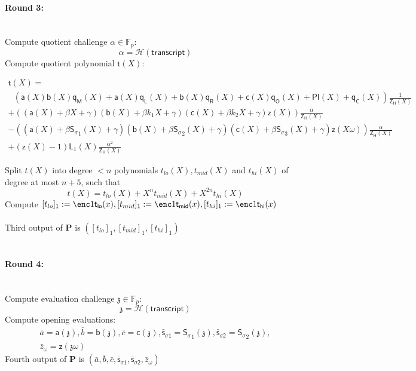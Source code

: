 \documentclass[11pt]{article} %
\newcommand{\F}{\ensuremath{\mathbb F}\xspace}
\newcommand{\chalpoint}{\ensuremath{\mathfrak{z}}\xspace}
\newcommand{\hash}{\ensuremath{\mathcal{H}}\xspace}
\newcommand{\prv}{\ensuremath{\mathsf{\mathbf{P}}}\xspace}
\newcommand{\sigpoly}{\ensuremath{\mathsf{S_{\sigma}}}\xspace}
\newcommand{\sigpolyevala}{\ensuremath{\mathsf{\bar{s}_{\sigma1}}}\xspace}
\newcommand{\sigpolyevalb}{\ensuremath{\mathsf{\bar{s}_{\sigma2}}}\xspace}
\newcommand{\pubinppoly}{\ensuremath{\mathsf{PI}}\xspace}
\newcommand{\ZeroH}{\ensuremath{Z_{H}} \xspace}
\newcommand{\lpoly}{\ensuremath{\mathsf{a}}\xspace}
\newcommand{\rpoly}{\ensuremath{\mathsf{b}}\xspace}
\newcommand{\opoly}{\ensuremath{\mathsf{c}}\xspace}
\newcommand{\idpermpoly}{\ensuremath{\mathsf{z}}\xspace}
\newcommand{\lagrangepoly}{\ensuremath{\mathsf{L}}\xspace}
\newcommand{\zeropoly}{\ensuremath{\mathsf{\ZeroH}}\xspace}
\newcommand{\snark}{\ensuremath{\mathsf{snark}}\xspace}
\newcommand{\Prove}{\mathcal{P}}
\newcommand{\Psnark}{\prv}%
\newcommand{\transcript}{\ensuremath{\mathsf{transcript}}\xspace}
\begin{document}
	\paragraph{\textbf{Round 3:}} \ \\
	Compute quotient challenge $\alpha \in \F_p:$ \[ \alpha = \hash(\transcript) \]
	Compute quotient polynomial $\mathsf{t}(X):$
	\begin{adjustwidth*}{-22mm}{-22mm}
	$$
	\begin{array}{l}
	\mathsf{t}(X) = \\
	\ \ \ \left( \lpoly(X)\rpoly(X)\mathsf{q_M}(X) + \lpoly(X)\mathsf{q_L}(X) + \rpoly(X)\mathsf{q_R}(X) + \opoly(X)\mathsf{q_O}(X) + \pubinppoly(X) + \mathsf{q_C}(X) \right) \frac{1}{\zeropoly(X)} \\
	+ \left((\lpoly(X) + \beta X + \gamma)(\rpoly(X) + \beta k_1 X + \gamma)(\opoly(X) + \beta k_2 X + \gamma )\idpermpoly(X) \right) \frac{\alpha}{\zeropoly(X)} \\
	- \left((\lpoly(X) + \beta \sigpoly_1(X) + \gamma)(\rpoly(X) + \beta \sigpoly_2(X) + \gamma)(\opoly(X) + \beta \sigpoly_3(X) + \gamma) \idpermpoly(X\omega) \right)\frac{\alpha}{\zeropoly(X)} \\
	+ \left(\idpermpoly(X) - 1 \right) \lagrangepoly_1(X) \frac{\alpha^2}{\zeropoly(X)}
	\end{array}
	$$
	\end{adjustwidth*}
	Split $t(X)$ into degree $<n$ polynomials $t_{lo}(X), t_{mid}(X)$ and $t_{hi}(X)$ of degree at most $n+5$, such that
	$$
	t(X) = t_{lo}(X) + X^nt_{mid}(X) + X^{2n}t_{hi}(X)
	$$
	Compute $[t_{lo}]_{1} := \enc1{\mathsf{t_{lo}}(x)}, [t_{mid}]_1 := \enc1{\mathsf{t_{mid}}(x)}, [t_{hi}]_1 := \enc1{\mathsf{t_{hi}}(x)}$ \\ \\
	Third output of $\Psnark$ is $([t_{lo}]_1, [t_{mid}]_1, [t_{hi}]_1)$
	\\ \\
	\noindent
	\paragraph{\textbf{Round 4:}} \ \\Compute evaluation challenge $\chalpoint \in \F_p:$ \[ \chalpoint = \hash(\transcript)\]
	Compute opening evaluations:
	$$
	\begin{array}{c}
	\bar{a} = \lpoly(\chalpoint), \bar{b} = \rpoly(\chalpoint), \bar{c} = \opoly(\chalpoint), \sigpolyevala = \sigpoly_1(\chalpoint), \sigpolyevalb = \sigpoly_2(\chalpoint), \\
	 \bar{z}_\omega = \idpermpoly(\chalpoint \omega)
	\end{array}
	$$
	Fourth output of $\Psnark$ is $(\bar{a}, \bar{b}, \bar{c}, \sigpolyevala, \sigpolyevalb, \bar{z}_\omega )$ \\ \\
	\noindent
\end{document}
